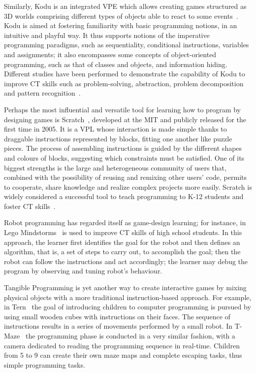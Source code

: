 Similarly, Kodu is an integrated \ac{VPE} which allows creating games structured as 3D worlds comprising different types of objects able to react to some events~\cite{Fowler:2012}. Kodu is aimed at fostering familiarity with basic programming notions, in an intuitive and playful way. It thus supports notions of the imperative programming paradigms, such as sequentiality, conditional instructions, variables and assignments; it also encompasses some concepts of object-oriented programming, such as that of classes and objects, and information hiding. Different studies have been performed to demonstrate the capability of Kodu to improve \ac{CT} skills such as problem-solving, abstraction, problem decomposition and pattern recognition~\cite{Fowler:2011,Touretzky:2013}.

Perhaps the most influential and versatile tool for learning how to program by designing games is Scratch~\cite{Resnick:2009bd}, developed at the MIT and publicly released for the first time in 2005. It is a \ac{VPL} whose interaction is made simple thanks to draggable instructions represented by blocks, fitting one another like puzzle pieces. The process of assembling instructions is guided by the different shapes and colours of blocks, suggesting which constraints must be satisfied. One of its biggest strengths is the large and heterogeneous community of users that, combined with the possibility of reusing and remixing other users' code, permits to cooperate, share knowledge and realize complex projects more easily. Scratch is widely considered a successful tool to teach programming to K-12 students and foster \ac{CT} skills~\cite{Brennan:2012,Cetin:2016,Grover:2015}.

Robot programming has regarded itself as game-design learning; for instance, in~\cite{Atmatzidou:2016} Lego Mindstorms~\cite{MINDSTORMS} is used to improve \ac{CT} skills of high school students. In this approach, the learner first identifies the goal for the robot and then defines an algorithm, that is, a set of steps to carry out, to accomplish the goal; then the robot can follow the instructions and act accordingly; the learner may debug the program by observing and tuning robot's behaviour.

Tangible Programming is yet another way to create interactive games by mixing physical objects with a more traditional instruction-based approach. For example, in Tern~\cite{Horn:2007} the goal of introducing children to computer programming is pursued by using small wooden cubes with instructions on their faces. The sequence of instructions results in a series of movements performed by a small robot. In T-Maze~\cite{Wang:2011} the programming phase is conducted in a very similar fashion, with a camera dedicated to reading the programming sequence in real-time. Children from 5 to 9 can create their own maze maps and complete escaping tasks, thus  simple programming tasks.

